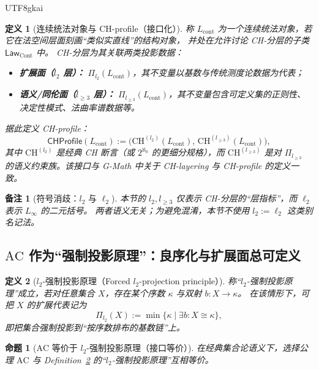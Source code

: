 \documentclass[12pt]{article}
\newtheorem{definition}{定义}[section]
\newtheorem{proposition}{命题}[section]
\newtheorem{remark}{备注}[section]
\newcommand{\Layer}{\ensuremath{\ell}}
\newcommand{\AC}{\ensuremath{\mathrm{AC}}}
\begin{document}
\begin{CJK*}{UTF8}{gkai}
\begin{definition}[连续统法对象与 CH-profile（接口化）]
\label{def:chprofile-interface}
称 $L_{\mathrm{cont}}$ 为一个\emph{连续统法对象}，若它在法空间层面刻画“类似实直线”的结构对象，
并处在允许讨论 CH-分层的子类 $\mathsf{Law}_{\mathrm{Cont}}$ 中。
CH-分层为其关联两类投影数据：
\begin{itemize}
  \item \textbf{扩展面（$l_2$ 层）：} $\Pi_{l_2}(L_{\mathrm{cont}})$，其不变量以基数与传统测度论数据为代表；
  \item \textbf{语义/同伦面（$l_{\ge 3}$ 层）：} $\Pi_{l_{\ge 3}}(L_{\mathrm{cont}})$，其不变量包含可定义集的正则性、
        决定性模式、法曲率谱数据等。
\end{itemize}
据此定义 CH-profile：
\[
  \mathsf{CHProfile}(L_{\mathrm{cont}})
  :=
  \bigl(
    \mathrm{CH}^{(l_2)}(L_{\mathrm{cont}}),\,
    \mathrm{CH}^{(l_{\ge 3})}(L_{\mathrm{cont}})
  \bigr),
\]
其中 $\mathrm{CH}^{(l_2)}$ 是经典 CH 断言（或 $2^{\aleph_0}$ 的更细分规格），而 $\mathrm{CH}^{(l_{\ge 3})}$ 是对
$\Pi_{l_{\ge 3}}$ 的语义约束族。该接口与 G-Math\cite{GaoZheng2025GFramework} 中关于 CH-layering 与 CH-profile 的定义一致。
\end{definition}

\begin{remark}[符号消歧：$l_2$ 与 $\Layer_2$]
本节的 $l_2,l_{\ge 3}$ 仅表示 CH-分层的“层指标”，而 $\Layer_2$ 表示 $L_\infty$ 的二元括号。
两者语义无关；为避免混淆，本节不使用 $l_2:=\Layer_2$ 这类别名记法。
\end{remark}

\subsection{$\AC$ 作为“强制投影原理”：良序化与扩展面总可定义}

\begin{definition}[$l_2$-强制投影原理（Forced $l_2$-projection principle）]
\label{def:forced-l2-projection}
称“$l_2$-强制投影原理”成立，若对任意集合 $X$，存在某个序数 $\kappa$ 与双射 $b:X\to\kappa$。
在该情形下，可把 $X$ 的\emph{扩展代表}记为
\[
  \Pi_{l_2}(X) := \min\{\kappa\mid \exists b:X\cong \kappa\},
\]
即把集合强制投影到“按序数排布的基数链”上。
\end{definition}

\begin{proposition}[$\AC$ 等价于 $l_2$-强制投影原理（接口等价）]
\label{prop:ac-equiv-forced-projection}
在经典集合论语义下，选择公理 $\AC$ 与 Definition~\ref{def:forced-l2-projection} 的“$l_2$-强制投影原理”互相等价。
\end{proposition}


\end{CJK*}
\end{document}
